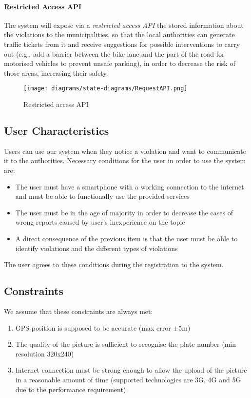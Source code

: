 \paragraph{Restricted Access API}
The system will expose via a \emph{restricted access API} the stored information about the violations to the municipalities, so that the local authorities can generate traffic tickets from it and receive suggestions for possible interventions to carry out (e.g., add a barrier between the bike lane and the part of the road for motorised vehicles to prevent unsafe parking), in order to decrease the risk of those areas, increasing their safety. \cite{Assignments} \newline
	\begin{figure}[h]
		\centering
		\texttt{[image: diagrams/state-diagrams/RequestAPI.png]}
		\caption{
			\label{fig:restrictedAPI} Restricted access API
		}
	\end{figure}


\subsection{User Characteristics}
	Users can use our system when they notice a violation and want to communicate it to the authorities. Necessary conditions for the user in order to use the system are:
 	\begin{itemize}
 		\item The user must have a smartphone with a working connection to the internet and must be able to functionally use the provided services
 		\item The user must be in the age of majority in order to decrease the cases of wrong reports caused by user's inexperience on the topic 
 		\item A direct consequence of the previous item is that the user must be able to identify violations and the different types of violations
 	\end{itemize}
 	The user agrees to these conditions during the registration to the system.
 	
\subsection{Constraints}
\label{sec:constraints}
	We assume that these constraints are always met:
	\begin{enumerate}[label=\textbf{C\arabic*}]
		\item GPS position is supposed to be accurate (max error $\pm5$m)
		\item The quality of the picture is sufficient to recognise the plate number (min resolution 320x240)
		\item Internet connection must be strong enough to allow the upload of the picture in a reasonable amount of time (supported technologies are 3G, 4G and 5G due to the performance requirement)
	\end{enumerate}
	
